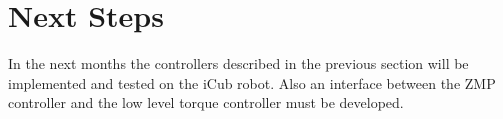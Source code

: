 \section{Next Steps}
In the next months the controllers described in the previous section will be implemented and
tested on the iCub robot.
Also an interface between the ZMP controller and the low level torque controller must be
developed.

